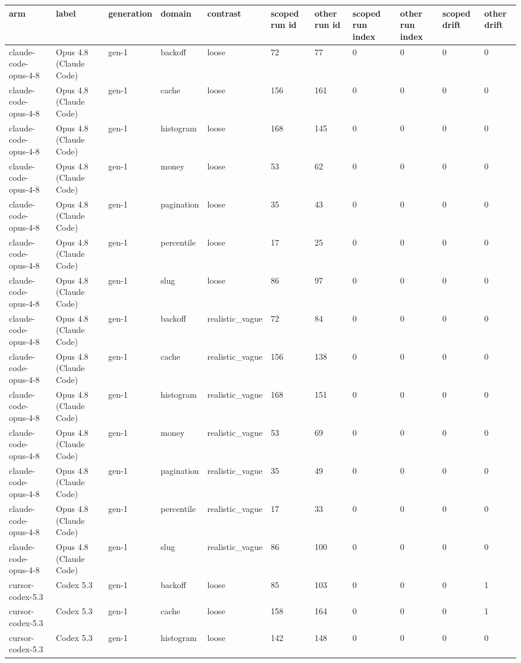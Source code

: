 \begin{tabular}{lllllllllll}
\toprule
arm & label & generation & domain & contrast & scoped run id & other run id & scoped run index & other run index & scoped drift & other drift \\
\midrule
claude-code-opus-4-8 & Opus 4.8 (Claude Code) & gen-1 & backoff & loose & 72 & 77 & 0 & 0 & 0 & 0 \\
claude-code-opus-4-8 & Opus 4.8 (Claude Code) & gen-1 & cache & loose & 156 & 161 & 0 & 0 & 0 & 0 \\
claude-code-opus-4-8 & Opus 4.8 (Claude Code) & gen-1 & histogram & loose & 168 & 145 & 0 & 0 & 0 & 0 \\
claude-code-opus-4-8 & Opus 4.8 (Claude Code) & gen-1 & money & loose & 53 & 62 & 0 & 0 & 0 & 0 \\
claude-code-opus-4-8 & Opus 4.8 (Claude Code) & gen-1 & pagination & loose & 35 & 43 & 0 & 0 & 0 & 0 \\
claude-code-opus-4-8 & Opus 4.8 (Claude Code) & gen-1 & percentile & loose & 17 & 25 & 0 & 0 & 0 & 0 \\
claude-code-opus-4-8 & Opus 4.8 (Claude Code) & gen-1 & slug & loose & 86 & 97 & 0 & 0 & 0 & 0 \\
claude-code-opus-4-8 & Opus 4.8 (Claude Code) & gen-1 & backoff & realistic\_vague & 72 & 84 & 0 & 0 & 0 & 0 \\
claude-code-opus-4-8 & Opus 4.8 (Claude Code) & gen-1 & cache & realistic\_vague & 156 & 138 & 0 & 0 & 0 & 0 \\
claude-code-opus-4-8 & Opus 4.8 (Claude Code) & gen-1 & histogram & realistic\_vague & 168 & 151 & 0 & 0 & 0 & 0 \\
claude-code-opus-4-8 & Opus 4.8 (Claude Code) & gen-1 & money & realistic\_vague & 53 & 69 & 0 & 0 & 0 & 0 \\
claude-code-opus-4-8 & Opus 4.8 (Claude Code) & gen-1 & pagination & realistic\_vague & 35 & 49 & 0 & 0 & 0 & 0 \\
claude-code-opus-4-8 & Opus 4.8 (Claude Code) & gen-1 & percentile & realistic\_vague & 17 & 33 & 0 & 0 & 0 & 0 \\
claude-code-opus-4-8 & Opus 4.8 (Claude Code) & gen-1 & slug & realistic\_vague & 86 & 100 & 0 & 0 & 0 & 0 \\
cursor-codex-5.3 & Codex 5.3 & gen-1 & backoff & loose & 85 & 103 & 0 & 0 & 0 & 1 \\
cursor-codex-5.3 & Codex 5.3 & gen-1 & cache & loose & 158 & 164 & 0 & 0 & 0 & 1 \\
cursor-codex-5.3 & Codex 5.3 & gen-1 & histogram & loose & 142 & 148 & 0 & 0 & 0 & 0 \\

\end{tabular}
